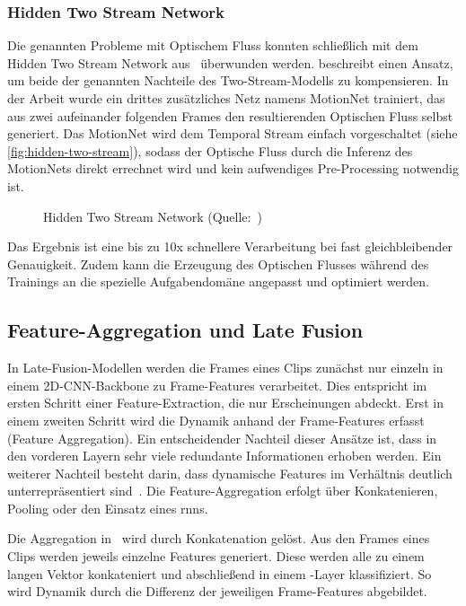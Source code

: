 \subsubsection{Hidden Two Stream Network}

Die genannten Probleme mit Optischem Fluss konnten schließlich mit dem Hidden Two Stream Network aus~\cite{Zhu17} überwunden werden.
\cite{Zhu17} beschreibt einen Ansatz, um beide der genannten Nachteile des Two-Stream-Modells zu kompensieren.
In der Arbeit wurde ein drittes zusätzliches Netz namens MotionNet trainiert, das aus zwei aufeinander folgenden Frames den resultierenden Optischen Fluss selbst generiert.
Das MotionNet wird dem Temporal Stream einfach vorgeschaltet (siehe \autoref{fig:hidden-two-stream}), sodass der Optische Fluss durch die Inferenz des MotionNets direkt errechnet wird und kein aufwendiges Pre-Processing notwendig ist.

\begin{figure}[h!]
    \centering
    \caption{Hidden Two Stream Network (Quelle:~\cite{Zhu17})}
    \label{fig:hidden-two-stream}
\end{figure}

Das Ergebnis ist eine bis zu 10x schnellere Verarbeitung bei fast gleichbleibender Genauigkeit.
Zudem kann die Erzeugung des Optischen Flusses während des Trainings an die spezielle Aufgabendomäne angepasst und optimiert werden.

\subsection{Feature-Aggregation und Late Fusion}
\label{subsec:late-fusion}

In Late-Fusion-Modellen werden die Frames eines Clips zunächst nur einzeln in einem 2D-CNN-Backbone zu Frame-Features verarbeitet.
Dies entspricht im ersten Schritt einer Feature-Extraction, die nur Erscheinungen abdeckt.
Erst in einem zweiten Schritt wird die Dynamik anhand der Frame-Features erfasst (Feature Aggregation).
Ein entscheidender Nachteil dieser Ansätze ist, dass in den vorderen Layern sehr viele redundante Informationen erhoben werden.
Ein weiterer Nachteil besteht darin, dass dynamische Features im Verhältnis deutlich unterrepräsentiert sind~\cite{Karpathy14}.
Die Feature-Aggregation erfolgt über Konkatenieren, Pooling oder den Einsatz eines \glspl{rnn}.

Die Aggregation in~\cite{Karpathy14} wird durch Konkatenation gelöst.
Aus den Frames eines Clips werden jeweils einzelne Features generiert.
Diese werden alle zu einem langen Vektor konkateniert und abschließend in einem \fc-Layer klassifiziert.
So wird Dynamik durch die Differenz der jeweiligen Frame-Features abgebildet.


